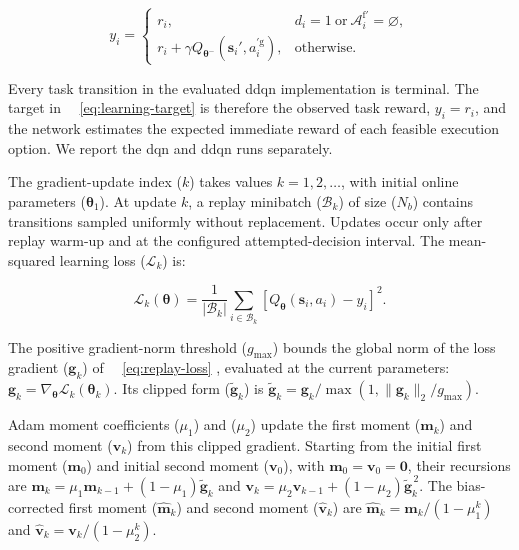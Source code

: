 \documentclass[journal]{IEEEtran}
\providecommand*{\algorithmautorefname}{Algorithm}
\providecommand*{\figureautorefname}{Figure}
\providecommand*{\subfigureautorefname}{Figure}
\providecommand*{\Autoref}[1]{%
  \begingroup
  \def\sectionautorefname{Section}%
  \def\subsectionautorefname{Subsection}%
  \def\subsubsectionautorefname{Subsubsection}%
  \def\algorithmautorefname{Algorithm}%
  \def\figureautorefname{Figure}%
  \def\subfigureautorefname{Figure}%
 ~\autoref{#1}%
  \endgroup
}
\newcommand{\Autoref}[1]{Eq.~\Autoref{#1}}
\begin{document}
\begin{equation}
\label{eq:learning-target}
y_i=
\begin{cases}
r_i,
&d_i=1
\ \text{or}\
\mathcal A_i^{\mathrm f\prime}=\varnothing,\\
r_i+\gamma
Q_{\boldsymbol\theta^{-}}
(\mathbf s_i',a_i^{\prime\mathrm g}),
&\text{otherwise}.
\end{cases}
\end{equation}

Every task transition in the evaluated \acs{ddqn} implementation is terminal. The target in~\Autoref{eq:learning-target} is therefore the observed task reward, \(y_i=r_i\), and the network estimates the expected immediate reward of each feasible execution option. We report the \acs{dqn} and \acs{ddqn} runs separately.

The gradient-update index (\(k\)) takes values \(k=1,2,\ldots\), with initial online parameters (\(\boldsymbol\theta_1\)). At update \(k\), a replay minibatch (\(\mathcal B_k\)) of size (\(N_b\)) contains transitions sampled uniformly without replacement. Updates occur only after replay warm-up and at the configured attempted-decision interval. The mean-squared learning loss (\(\mathcal L_k\)) is:

\begin{equation}
\label{eq:replay-loss}
\mathcal L_k(\boldsymbol\theta)
=
\frac{1}{|\mathcal B_k|}
\sum_{i\in\mathcal B_k}
\left[
Q_{\boldsymbol\theta}(\mathbf s_i,a_i)-y_i
\right]^2.
\end{equation}

The positive gradient-norm threshold (\(g_{\max}\)) bounds the global norm of the loss gradient (\(\mathbf g_k\)) of~\Autoref{eq:replay-loss}, evaluated at the current parameters: \(\mathbf g_k=\nabla_{\boldsymbol\theta}\mathcal L_k(\boldsymbol\theta_k)\). Its clipped form (\(\widetilde{\mathbf g}_k\)) is \(\widetilde{\mathbf g}_k=\mathbf g_k/\max(1,\|\mathbf g_k\|_2/g_{\max})\).

Adam moment coefficients (\(\mu_1\)) and (\(\mu_2\)) update the first moment (\(\mathbf m_k\)) and second moment (\(\mathbf v_k\)) from this clipped gradient. Starting from the initial first moment (\(\mathbf m_0\)) and initial second moment (\(\mathbf v_0\)), with \(\mathbf m_0=\mathbf v_0=\mathbf0\), their recursions are \(\mathbf m_k=\mu_1\mathbf m_{k-1}+(1-\mu_1)\widetilde{\mathbf g}_k\) and \(\mathbf v_k=\mu_2\mathbf v_{k-1}+(1-\mu_2)\widetilde{\mathbf g}_k^{\,2}\). The bias-corrected first moment (\(\widehat{\mathbf m}_k\)) and second moment (\(\widehat{\mathbf v}_k\)) are \(\widehat{\mathbf m}_k=\mathbf m_k/(1-\mu_1^k)\) and \(\widehat{\mathbf v}_k=\mathbf v_k/(1-\mu_2^k)\).
\end{document}
